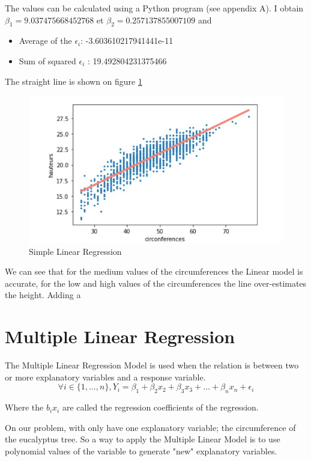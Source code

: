 \documentclass[
	12pt, %
]{article}
\theoremstyle{definition}
\begin{document}
The values can be calculated using a Python program (see appendix A). I obtain $\beta_1 =  9.037475668452768$  et $\beta_2 = 0.257137855007109$ and

\begin{itemize}
    \item Average of the $\epsilon_i$: -3.603610217941441e-11
    \item Sum of squared $\epsilon_i$ : 19.492804231375466
\end{itemize}

The straight line is shown on figure \ref{fig:regression simple}

\begin{figure}[H]
	\includegraphics[scale=0.8]{regression_simple.jpg}
    \caption{Simple Linear Regression}
    \label{fig:regression simple}
\end{figure}


We can see that for the medium values of the circumferences the Linear model is accurate, for the low and high values of the circumferences the line over-estimates the height. Adding a 
    
\pagebreak
\section{Multiple Linear Regression}


The Multiple Linear Regression Model is used when the relation is between two or more explanatory variables and a response variable.
$$
\forall i \in \{1,\dots,n\}, Y_i = \beta_1 + \beta_2x_2 + \beta_3x_3 + \ldots + \beta_nx_n + \epsilon_i
$$

Where the $b_ix_i$ are called the regression coefficients of the regression. 

\bigskip
On our problem, with only have one explanatory variable; the circumference of the eucalyptus tree. So a way to apply the Multiple Linear Model is to use polynomial values of the variable to generate "new" explanatory variables. 
\end{document}
